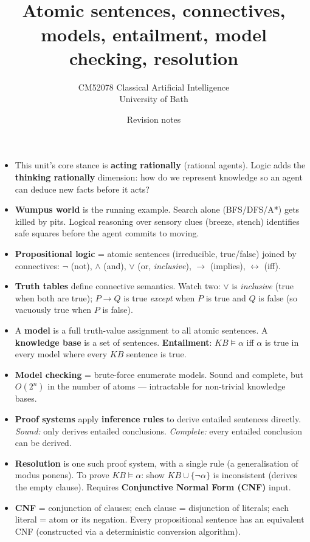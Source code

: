 \documentclass[11pt, a4paper]{article}
\title{\vspace{-1cm}{\Huge\bfseries Week 7 — Logical Agents: Propositional Logic} \\[0.4em]{\large Atomic sentences, connectives, models, entailment, model checking, resolution}}
\author{\large CM52078 Classical Artificial Intelligence \\[0.2em]\normalsize University of Bath}
\date{Revision notes}
\begin{document}
\maketitle
\thispagestyle{empty}

\vspace{1em}

\begin{tldrbox}
\begin{itemize}[leftmargin=*]
  \item This unit's core stance is \textbf{acting rationally} (rational agents). Logic adds the \textbf{thinking rationally} dimension: how do we represent knowledge so an agent can deduce new facts before it acts?
  \item \textbf{Wumpus world} is the running example. Search alone (BFS/DFS/A*) gets killed by pits. Logical reasoning over sensory clues (breeze, stench) identifies safe squares before the agent commits to moving.
  \item \textbf{Propositional logic} = atomic sentences (irreducible, true/false) joined by connectives: $\neg$ (not), $\land$ (and), $\lor$ (or, \emph{inclusive}), $\rightarrow$ (implies), $\leftrightarrow$ (iff).
  \item \textbf{Truth tables} define connective semantics. Watch two: $\lor$ is \emph{inclusive} (true when both are true); $P \rightarrow Q$ is true \emph{except} when $P$ is true and $Q$ is false (so vacuously true when $P$ is false).
  \item A \textbf{model} is a full truth-value assignment to all atomic sentences. A \textbf{knowledge base} is a set of sentences. \textbf{Entailment}: $KB \models \alpha$ iff $\alpha$ is true in every model where every $KB$ sentence is true.
  \item \textbf{Model checking} = brute-force enumerate models. Sound and complete, but $O(2^n)$ in the number of atoms — intractable for non-trivial knowledge bases.
  \item \textbf{Proof systems} apply \textbf{inference rules} to derive entailed sentences directly. \emph{Sound:} only derives entailed conclusions. \emph{Complete:} every entailed conclusion can be derived.
  \item \textbf{Resolution} is one such proof system, with a single rule (a generalisation of modus ponens). To prove $KB \models \alpha$: show $KB \cup \{\neg\alpha\}$ is inconsistent (derives the empty clause). Requires \textbf{Conjunctive Normal Form (CNF)} input.
  \item \textbf{CNF} = conjunction of clauses; each clause = disjunction of literals; each literal = atom or its negation. Every propositional sentence has an equivalent CNF (constructed via a deterministic conversion algorithm).
\end{itemize}
\end{tldrbox}
\end{document}

